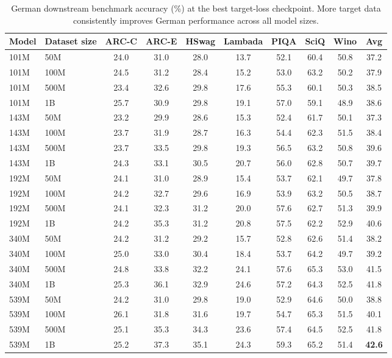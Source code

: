 \begin{table}[h]
\centering
\caption{German downstream benchmark accuracy (\%) at the best target-loss checkpoint. More target data consistently improves German performance across all model sizes.}
\label{tab:downstream_de}
\begin{tabular}{ll ccccccc c}
\toprule
Model & Dataset size & ARC-C & ARC-E & HSwag & Lambada & PIQA & SciQ & Wino & \textbf{Avg} \\
\midrule
101M & 50M  & 24.0 & 31.0 & 28.0 & 13.7 & 52.1 & 60.4 & 50.8 & 37.2 \\
101M & 100M & 24.5 & 31.2 & 28.4 & 15.2 & 53.0 & 63.2 & 50.2 & 37.9 \\
101M & 500M & 23.4 & 32.6 & 29.8 & 17.6 & 55.3 & 60.1 & 50.3 & 38.5 \\
101M & 1B   & 25.7 & 30.9 & 29.8 & 19.1 & 57.0 & 59.1 & 48.9 & 38.6 \\
\midrule
143M & 50M  & 23.2 & 29.9 & 28.6 & 15.3 & 52.4 & 61.7 & 50.1 & 37.3 \\
143M & 100M & 23.7 & 31.9 & 28.7 & 16.3 & 54.4 & 62.3 & 51.5 & 38.4 \\
143M & 500M & 23.7 & 33.5 & 29.8 & 19.3 & 56.5 & 63.2 & 50.8 & 39.6 \\
143M & 1B   & 24.3 & 33.1 & 30.5 & 20.7 & 56.0 & 62.8 & 50.7 & 39.7 \\
\midrule
192M & 50M  & 24.1 & 31.0 & 28.9 & 15.4 & 53.7 & 62.1 & 49.7 & 37.8 \\
192M & 100M & 24.2 & 32.7 & 29.6 & 16.9 & 53.9 & 63.2 & 50.5 & 38.7 \\
192M & 500M & 24.1 & 32.3 & 31.2 & 20.0 & 57.6 & 62.7 & 51.3 & 39.9 \\
192M & 1B   & 24.2 & 35.3 & 31.2 & 20.8 & 57.5 & 62.2 & 52.9 & 40.6 \\
\midrule
340M & 50M  & 24.2 & 31.2 & 29.2 & 15.7 & 52.8 & 62.6 & 51.4 & 38.2 \\
340M & 100M & 25.0 & 33.0 & 30.4 & 18.4 & 53.7 & 64.2 & 49.7 & 39.2 \\
340M & 500M & 24.8 & 33.8 & 32.2 & 24.1 & 57.6 & 65.3 & 53.0 & 41.5 \\
340M & 1B   & 25.3 & 36.1 & 32.9 & 24.6 & 57.2 & 64.3 & 52.5 & 41.8 \\
\midrule
539M & 50M  & 24.2 & 31.0 & 29.8 & 19.0 & 52.9 & 64.6 & 50.0 & 38.8 \\
539M & 100M & 26.1 & 31.8 & 31.6 & 19.7 & 54.7 & 65.3 & 51.5 & 40.1 \\
539M & 500M & 25.1 & 35.3 & 34.3 & 23.6 & 57.4 & 64.5 & 52.5 & 41.8 \\
539M & 1B   & 25.2 & 37.3 & 35.1 & 24.3 & 59.3 & 65.2 & 51.4 & \textbf{42.6} \\
\bottomrule
\end{tabular}
\end{table}


